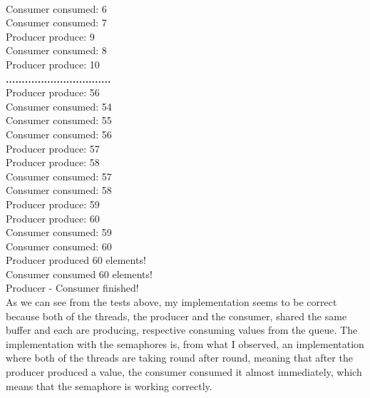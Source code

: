 \documentclass[14pt]{article}
\begin{document}
\\Consumer consumed: 6
\\Consumer consumed: 7
\\Producer produce: 9
\\Consumer consumed: 8
\\Producer produce: 10
\\\textbf{.................................}
\\Producer produce: 56
\\Consumer consumed: 54
\\Consumer consumed: 55
\\Consumer consumed: 56
\\Producer produce: 57
\\Producer produce: 58
\\Consumer consumed: 57
\\Consumer consumed: 58
\\Producer produce: 59
\\Producer produce: 60
\\Consumer consumed: 59
\\Consumer consumed: 60
\\Producer produced 60 elements!
\\Consumer consumed 60 elements!
\\Producer - Consumer finished!
\vspace{2.5 mm}
\\As we can see from the tests above, my implementation seems to be correct because both of the threads, the producer and the consumer, shared the same buffer and each are producing, respective consuming values from the queue. The implementation with the semaphores is, from what I observed, an implementation where both of the threads are taking round after round, meaning that after the producer produced a value, the consumer consumed it almost immediately, which means that the semaphore is working correctly.  
\end{document}
